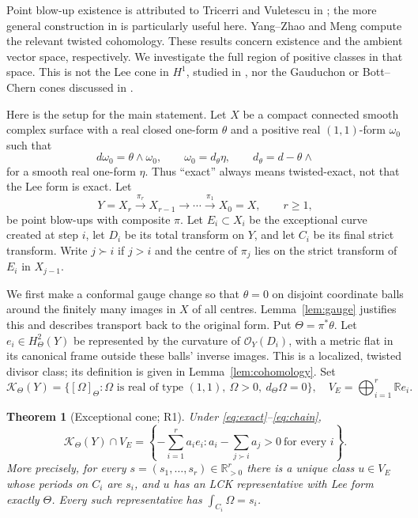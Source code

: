 \documentclass[12pt]{amsart}
\newtheorem{thm}{Theorem}[section]
\theoremstyle{definition}
\theoremstyle{remark}
\numberwithin{equation}{section}
\newcommand{\cK}{\mathcal{K}}
\newcommand{\cO}{\mathcal{O}}
\newcommand{\R}{\mathbb{R}}
\begin{document}
Point blow-up existence is attributed to Tricerri and Vuletescu in \cite[\S1.1]{OVV}; the more general construction in \cite[Theorem 2.8 and Lemma 3.4]{OVV} is particularly useful here. Yang--Zhao \cite[Theorem 1.1]{YZ} and Meng \cite[Theorem 1.2]{Meng} compute the relevant twisted cohomology. These results concern existence and the ambient vector space, respectively. We investigate the full region of positive classes in that space. This is not the Lee cone in $H^1$, studied in \cite[\S8]{OVLee}, nor the Gauduchon or Bott--Chern cones discussed in \cite[\S4]{OVBalanced}.

Here is the setup for the main statement. Let $X$ be a compact connected smooth complex surface with a real closed one-form $\theta$ and a positive real $(1,1)$-form $\omega_0$ such that
\begin{equation}\label{eq:exact}
 d\omega_0=\theta\wedge\omega_0,\qquad
 \omega_0=d_\theta\eta,\qquad d_\theta=d-\theta\wedge
\end{equation}
for a smooth real one-form $\eta$. Thus ``exact'' always means twisted-exact, not that the Lee form is exact. Let
\begin{equation}\label{eq:chain}
 Y=X_r\xrightarrow{\pi_r}X_{r-1}\longrightarrow\cdots
 \xrightarrow{\pi_1}X_0=X,\qquad r\geq1,
\end{equation}
be point blow-ups with composite $\pi$. Let $E_i\subset X_i$ be the exceptional curve created at step $i$, let $D_i$ be its total transform on $Y$, and let $C_i$ be its final strict transform. Write $j\succ i$ if $j>i$ and the centre of $\pi_j$ lies on the strict transform of $E_i$ in $X_{j-1}$.

We first make a conformal gauge change so that $\theta=0$ on disjoint coordinate balls around the finitely many images in $X$ of all centres. Lemma~\ref{lem:gauge} justifies this and describes transport back to the original form. Put $\Theta=\pi^*\theta$. Let $e_i\in H^2_\Theta(Y)$ be represented by the curvature of $\cO_Y(D_i)$, with a metric flat in its canonical frame outside these balls' inverse images. This is a localized, twisted divisor class; its definition is given in Lemma~\ref{lem:cohomology}. Set
\begin{equation}\label{eq:cone}
 \cK_\Theta(Y)=\{[\Omega]_\Theta:\Omega\text{ is real of type }(1,1),
 \ \Omega>0,\ d_\Theta\Omega=0\},\quad
 V_E=\bigoplus_{i=1}^r\R e_i.
\end{equation}

\begin{thm}[Exceptional cone; R1]\label{thm:main}
Under \eqref{eq:exact}--\eqref{eq:chain},
\begin{equation}\label{eq:maincone}
 \cK_\Theta(Y)\cap V_E
 =\left\{-\sum_{i=1}^r a_i e_i:
 a_i-\sum_{j\succ i}a_j>0\ \text{for every }i\right\}.
\end{equation}
More precisely, for every $s=(s_1,\ldots,s_r)\in\R_{>0}^r$ there is a unique class $u\in V_E$ whose periods on $C_i$ are $s_i$, and $u$ has an LCK representative with Lee form exactly $\Theta$. Every such representative has $\int_{C_i}\Omega=s_i$.
\end{thm}
\end{document}
